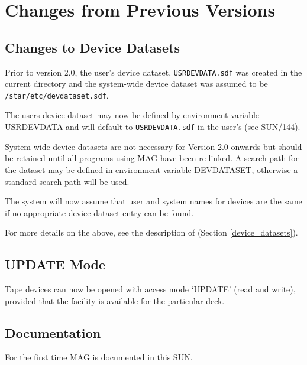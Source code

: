 \documentclass[11pt]{starlink}
\begin{document}
\section{Changes from Previous Versions}
\subsection{Changes to Device Datasets}
Prior to version 2.0, the user's device dataset, \texttt{USRDEVDATA.sdf} was
created in the current directory and the system-wide device dataset was assumed
to be \texttt{/star/etc/devdataset.sdf}.

The users device dataset may now be defined by environment variable USRDEVDATA
and will default to \texttt{USRDEVDATA.sdf} in the user's
 (see SUN/144).

System-wide device datasets are not necessary for Version 2.0 onwards but
should be retained until all programs using MAG have been re-linked.
A search path for the dataset may be defined in environment variable
DEVDATASET, otherwise a standard search path will be used.

The system will now assume that user and system names for devices are the
same if no appropriate device dataset entry can be found.

For more details on the above, see the description of
 (Section \ref{device_datasets}).

\subsection{UPDATE Mode}
Tape devices can now be opened with access mode `UPDATE' (read and write),
provided that the facility is available for the particular deck.

\subsection{Documentation}
For the first time MAG is documented in this SUN.
\end{document}

